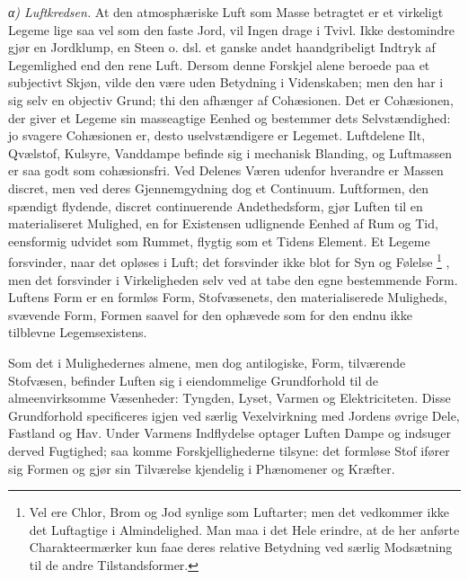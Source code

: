 \documentclass[12pt,a4paper]{book}
\newcommand{\subrunin}[1]{\emph{#1}\hspace{0.4em}}
\begin{document}
\subrunin{α) Luftkredsen.} At den atmosphæriske Luft som Masse betragtet
er et virkeligt Legeme lige saa vel som den faste Jord, vil Ingen drage i
Tvivl. Ikke destomindre gjør en Jordklump, en Steen o. dsl. et ganske
andet haandgribeligt Indtryk af Legemlighed end den rene Luft. Dersom
denne Forskjel alene beroede paa et subjectivt Skjøn, vilde den være uden
Betydning i Videnskaben; men den har i sig selv en objectiv Grund; thi
den afhænger af Cohæsionen. Det er Cohæsionen, der giver et Legeme sin
masseagtige Eenhed og bestemmer dets Selvstændighed: jo svagere
Cohæsionen er, desto uselvstændigere er Legemet. Luftdelene Ilt,
Qvælstof, Kulsyre, Vanddampe befinde sig i mechanisk Blanding, og
Luftmassen er saa godt som cohæsionsfri. Ved Delenes Væren udenfor
hverandre er Massen discret, men ved deres Gjennemgydning dog et
Continuum. Luftformen, den spændigt flydende, discret continuerende
Andethedsform, gjør Luften til en materialiseret Mulighed, en for
Existensen udlignende Eenhed af Rum og Tid, eensformig udvidet som
Rummet, flygtig som et Tidens Element. Et Legeme forsvinder, naar
det opløses i Luft; det forsvinder ikke blot for Syn og Følelse%
\footnote{%
Vel ere Chlor, Brom og Jod synlige som Luftarter; men det vedkommer ikke
det Luftagtige i Almindelighed. Man maa i det Hele erindre, at de her
anførte Charakteermærker kun faae deres relative Betydning ved særlig
Modsætning til de andre Tilstandsformer.}%
, men det forsvinder i Virkeligheden selv ved at tabe den egne
bestemmende Form. Luftens Form er en formløs Form, Stofvæsenets, den
materialiserede Muligheds, svævende Form, Formen saavel for den ophævede
som for den endnu ikke tilblevne Legemsexistens.

Som det i Mulighedernes almene, men dog antilogiske, Form, tilværende
Stofvæsen, befinder Luften sig i eiendommelige Grundforhold til de
almeenvirksomme Væsenheder: Tyngden, Lyset, Varmen og Elektriciteten.
Disse Grundforhold specificeres igjen ved særlig Vexelvirkning med
Jordens øvrige Dele, Fastland og Hav. Under Varmens Indflydelse optager
Luften Dampe og indsuger derved Fugtighed; saa komme Forskjellighederne
tilsyne: det formløse Stof ifører sig Formen og gjør sin Tilværelse
kjendelig i Phænomener og Kræfter.
\end{document}
